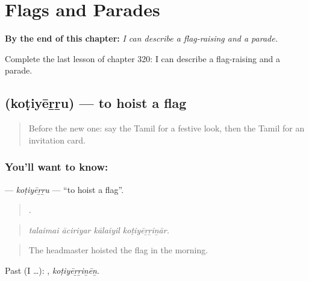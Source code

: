 
\chapter{Flags and Parades}
\label{ch:ta-flags-and-parades}

\begin{chapteropening}
\textbf{By the end of this chapter:} \emph{I can describe a flag-raising and a parade.}

Complete the last lesson of chapter 320: I can describe a flag-raising and a parade.
\end{chapteropening}

\section[\texorpdfstring{\ta{கொடியேற்று} (koṭiyēṟṟu)}{கொடியேற்று (koṭiyēṟṟu)}]{ (koṭiyēṟṟu) — to hoist a flag}

\label{lesson:TA-C320-kotiyerru}



\begin{quote}
Before the new one: say the Tamil for a festive look, then the Tamil for an invitation card.
\end{quote}

\subsection*{You'll want to know: }
\textbf{} — \emph{koṭiyēṟṟu} — \textquotedblleft{}to hoist a flag\textquotedblright{}.

\begin{quote}
   .
\end{quote}

\begin{quote}
\emph{talaimai āciriyar kālaiyil koṭiyēṟṟiṉār.}
\end{quote}

\begin{quote}
The headmaster hoisted the flag in the morning.
\end{quote}

Past (I …): , \emph{koṭiyēṟṟiṉēṉ}.

